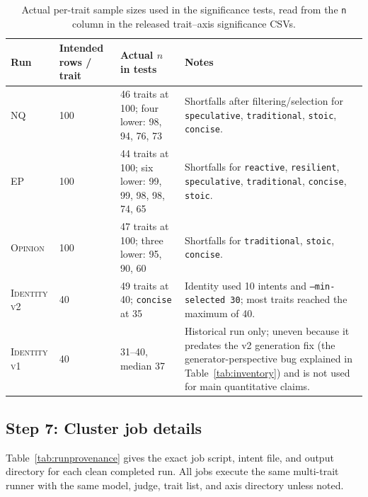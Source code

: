\documentclass{article}
\newcommand{\ax}[1]{\texttt{#1}}   %
\begin{document}
\begin{table}[!htbp]
\centering
\footnotesize
\begin{tabularx}{\textwidth}{L{0.16\textwidth}L{0.15\textwidth}L{0.32\textwidth}Y}
\toprule
Run & Intended rows / trait & Actual $n$ in tests & Notes \\
\midrule
\textsc{NQ} & 100 & 46 traits at 100; four lower: 98, 94, 76, 73 & Shortfalls after filtering/selection for \ax{speculative}, \ax{traditional}, \ax{stoic}, \ax{concise}. \\
\textsc{EP} & 100 & 44 traits at 100; six lower: 99, 99, 98, 98, 74, 65 & Shortfalls for \ax{reactive}, \ax{resilient}, \ax{speculative}, \ax{traditional}, \ax{concise}, \ax{stoic}. \\
\textsc{Opinion} & 100 & 47 traits at 100; three lower: 95, 90, 60 & Shortfalls for \ax{traditional}, \ax{stoic}, \ax{concise}. \\
\textsc{Identity v2} & 40 & 49 traits at 40; \ax{concise} at 35 & Identity used 10 intents and \texttt{--min-selected 30}; most traits reached the maximum of 40. \\
\textsc{Identity v1} & 40 & 31--40, median 37 & Historical run only; uneven because it predates the v2 generation fix (the generator-perspective bug explained in Table~\ref{tab:inventory}) and is not used for main quantitative claims. \\
\bottomrule
\end{tabularx}
\caption{Actual per-trait sample sizes used in the significance tests, read from the \texttt{n} column in the released trait--axis significance CSVs.}
\label{tab:actualn}
\end{table}

\subsection{Step 7: Cluster job details}

Table~\ref{tab:runprovenance} gives the exact job script, intent file, and output directory for each clean completed run. All jobs execute the same multi-trait runner with the same model, judge, trait list, and axis directory unless noted.
\end{document}
